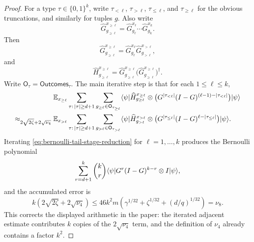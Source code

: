 \begin{proof}
	\leanok
	For a type $\tau \in \{0,1\}^k$, write $\tau_{<\ell}$, $\tau_{>\ell}$, $\tau_{\le \ell}$, and $\tau_{\ge \ell}$ for the obvious truncations, and similarly for tuples $g$. Also write
	\[
		\widehat G_{g_{\ge \ell}}^{x_{\ge \ell}}
		=
		\widehat G_{g_\ell}^{x_\ell}\cdots \widehat G_{g_k}^{x_k}.
	\]
	Then
	\begin{equation}\label{eq:G-recurrence}
		\widehat G_{g_{\ge \ell}}^{x_{\ge \ell}}
		=
		\widehat G_{g_\ell}^{x_\ell}\widehat G_{g_{>\ell}}^{x_{>\ell}},
	\end{equation}
	and
	\begin{equation}\label{eq:split-H-into-two-Gs}
		\widehat H_{g_{\ge \ell}}^{x_{\ge \ell}}
		=
		\widehat G_{g_{\ge \ell}}^{x_{\ge \ell}}
		\bigl(\widehat G_{g_{\ge \ell}}^{x_{\ge \ell}}\bigr)^\dagger.
	\end{equation}
	Write $\mathsf O_\tau = \mathsf{Outcomes}_\tau$. The main iterative step is that for each $1\le \ell \le k$,
	\begin{align}
		                                         & \mathbb{E}_{x_{\ge \ell}} \sum_{\tau:\,|\tau|\ge d+1} \sum_{g_{\ge \ell}\in \mathsf O_{\tau_{\ge \ell}}}
		\langle \psi \rvert \widehat H_{g_{\ge \ell}}^{x_{\ge \ell}}
		\otimes \bigl(G^{|\tau_{<\ell}|}(I-G)^{(\ell-1)-|\tau_{<\ell}|}\bigr)\lvert \psi \rangle\nonumber                                                        \\
		\approx_{2\sqrt{2\zeta}+2\sqrt{\nu_4}}{} &
		\mathbb{E}_{x_{>\ell}} \sum_{\tau:\,|\tau|\ge d+1} \sum_{g_{>\ell}\in \mathsf O_{\tau_{>\ell}}}
		\langle \psi \rvert \widehat H_{g_{>\ell}}^{x_{>\ell}}
		\otimes \bigl(G^{|\tau_{\le \ell}|}(I-G)^{\ell-|\tau_{\le \ell}|}\bigr)\lvert \psi \rangle.
		\label{eq:bernoulli-tail-stage-reduction}
	\end{align}
	Iterating \ref{eq:bernoulli-tail-stage-reduction} for $\ell=1,\dots,k$ produces the Bernoulli polynomial
	\[
		\sum_{r=d+1}^k \binom{k}{r} \langle \psi \rvert G^r(I-G)^{k-r} \otimes I \lvert \psi \rangle,
	\]
	and the accumulated error is
	\[
		k(2\sqrt{2\zeta}+2\sqrt{\nu_4})
		\le
		46k^2m\left(\gamma^{1/32}+\zeta^{1/32}+(d/q)^{1/32}\right)
		= \nu_8.
	\]
	This corrects the displayed arithmetic in the paper: the iterated adjacent
	estimate contributes $k$ copies of the $2\sqrt{\nu_4}$ term, and the
	definition of $\nu_4$ already contains a factor $k^2$.


\end{proof}
